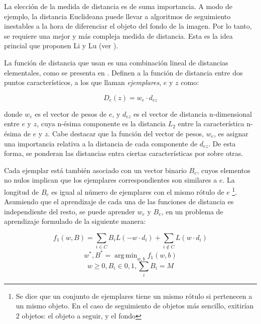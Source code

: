 \documentclass[a4paper,10pt]{article}
\DeclareMathOperator*{\argmin}{arg\,min}
\begin{document}
La elección de la medida de distancia es de suma importancia. A modo de
ejemplo, la distancia Euclideana puede llevar a algoritmos de seguimiento
inestables a la hora de diferenciar el objeto del fondo de la imagen. Por lo
tanto, se requiere una mejor y más compleja medida de distancia. Esta es la
idea princial que proponen Li y Lu (ver \cite{local-learning}).

La función de distancia que usan es una combinación lineal de distancias
elementales, como se presenta en \cite{malisiewicz-cvpr08}. Definen a la
función de distancia entre dos puntos característicos, a los que llaman
\textit{ejemplares}, $e$ y $z$ como:

\begin{equation}
    \label{eq:distance-exemplar}
    D_{e}(z) = w_{e} \cdot d_{ez}
\end{equation}

donde $w_{e}$ es el vector de pesos de $e$, y $d_{ez}$ es el vector de
distancia n-dimensional entre $e$ y $z$, cuya n-ésima componente es la
distancia $L_{2}$ entre la característica n-ésima de $e$ y $z$. Cabe destacar
que la función del vector de pesos, $w_{e}$, es asignar una importancia relativa a
la distancia de cada componente de $d_{ez}$. De esta forma, se ponderan las distancias
entra ciertas características por sobre otras.

Cada ejemplar está también asociado con un vector binario $B_{e}$, cuyos elementos
no nulos implican que los ejemplares correspondientes son similares a $e$. La
longitud de $B_{e}$ es igual al número de ejemplares con el mismo rótulo de $e$
\footnote{Se dice que un conjunto de ejemplares tiene un mismo rótulo si pertenecen a un mismo objeto. En el caso de seguimiento de objetos
más sencillo, exitirían 2 objetos: el objeto a seguir, y el fondo}.
Asumiendo que el aprendizaje de cada una de las funciones de distancia es
independiente del resto, se puede aprender $w_{e}$ y $B_{e}$, en un problema
de aprendizaje formulado de la siguiente manera:

\begin{equation}
    \label{eq:learning-problem}
    f_{1}(w,B) = \sum_{i \in C} B_{i}L(-w \cdot d_{i}) + \sum_{i\notin C}L(w \cdot d_{i})
\end{equation}
\begin{equation}
    {w^{*}, B^{*} = \argmin_{w,b} f_{1} (w,b) }
\end{equation}
\begin{equation}
   w \geq 0, B_{i} \in {0,1}, \sum_{i} B_{i} = M
\end{equation}
\end{document}
